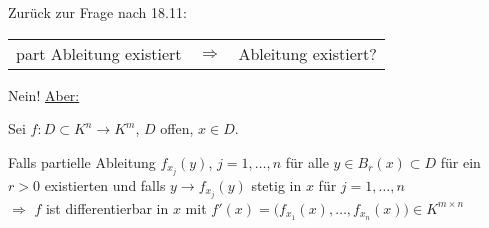 Zurück zur Frage nach 18.11: \\ \begin{tabularx}{\linewidth}{XcX}
	\hfill part Ableitung existiert & $\Rightarrow$ & Ableitung existiert?
\end{tabularx}
Nein! \uline{Aber:}

\begin{theorem}
	Sei $f:D\subset K^n\to K^m$, $D$ offen, $x\in D$.
	
	Falls partielle Ableitung $f_{x_j}(y)$, $j=1,\dotsc,n$ für alle $y\in B_r(x)\subset D$ für ein $r > 0$ existierten und falls $y\to f_{x_j}(y)$ stetig in $x$ für $j=1,\dotsc,n$ \\
	$\Rightarrow$ $f$ ist differentierbar in $x$ mit $f'(x) = \big( f_{x_1}(x), \dotsc, f_{x_n}(x) \big) \in K^{m\times n}$
\end{theorem}

